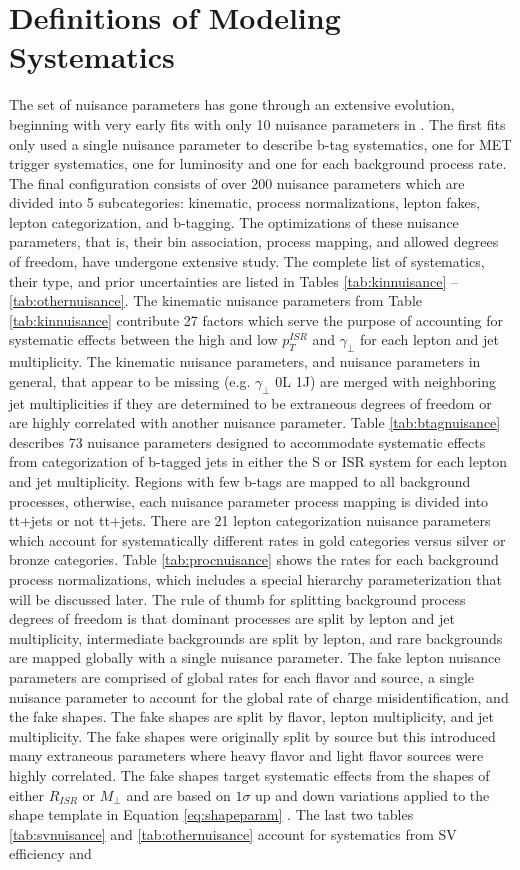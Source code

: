 \section{Definitions of Modeling Systematics}
The set of nuisance parameters has gone through an extensive evolution, beginning with very early fits with only 10 nuisance parameters in \cite{erich}. The first fits only used a single nuisance parameter to describe b-tag systematics, one for MET trigger systematics, one for luminosity and one for each background process rate. The final configuration consists of over 200 nuisance parameters which are divided into 5 subcategories: kinematic, process normalizations, lepton fakes, lepton categorization, and b-tagging. The optimizations of these nuisance parameters, that is, their bin association, process mapping, and  allowed degrees of freedom, have undergone extensive study. The complete list of systematics, their type, and prior uncertainties are listed in Tables \ref{tab:kinnuisance} -- \ref{tab:othernuisance}.  The kinematic nuisance parameters from Table \ref{tab:kinnuisance} contribute 27 factors which serve the purpose of accounting for systematic effects between the high and low $p_T^{ISR}$ and $\gamma_\perp$ for each lepton and jet multiplicity. The kinematic nuisance parameters, and nuisance parameters in general, that appear to be missing (e.g. $\gamma_\perp$ 0L 1J) are merged with neighboring jet multiplicities if they are determined to be extraneous degrees of freedom or are highly correlated with another nuisance parameter. Table \ref{tab:btagnuisance} describes 73 nuisance parameters designed to accommodate systematic effects from categorization of b-tagged jets in either the S or ISR system for each lepton and jet multiplicity. Regions with few b-tags are mapped to all background processes, otherwise, each nuisance parameter process mapping is divided into tt+jets or not tt+jets. There are 21 lepton categorization nuisance parameters which account for systematically different rates in gold categories versus silver or bronze categories. Table \ref{tab:procnuisance} shows the rates for each background process normalizations, which includes a special hierarchy parameterization that will be discussed later. The rule of thumb for splitting background process degrees of freedom is that dominant processes are split by lepton and jet multiplicity, intermediate backgrounds are split by lepton, and rare backgrounds are mapped globally with a single nuisance parameter. The fake lepton nuisance parameters are comprised of global rates for each flavor and source, a single nuisance parameter to account for the global rate of  charge misidentification, and the fake shapes. The fake shapes are split by flavor, lepton multiplicity, and jet multiplicity. The fake shapes were originally split by source but this introduced many extraneous parameters where heavy flavor and light flavor sources were highly correlated. The fake shapes target systematic effects from the shapes of either $R_{ISR}$ or $M_\perp$ and are based on $1\sigma$ up and down variations applied to the shape template in Equation \ref{eq:shapeparam} \cite{margaret}. The last two tables \ref{tab:svnuisance} and \ref{tab:othernuisance} account for systematics from SV efficiency and 